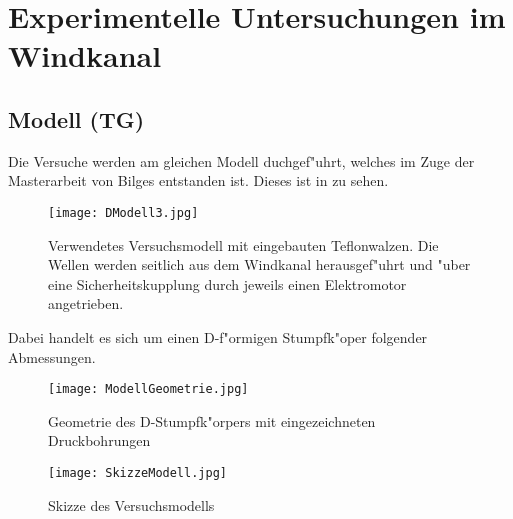 \chapter{Experimentelle Untersuchungen im Windkanal}\label{s:versuche}


\section{Modell (TG)}
Die Versuche werden am gleichen Modell duchgef"uhrt, welches im Zuge der Masterarbeit von Bilges \cite{Bilges.2018} entstanden ist. Dieses ist in  zu sehen.

\begin{figure}[h]
	\centering
	\texttt{[image: DModell3.jpg]}
	\caption{Verwendetes Versuchsmodell mit eingebauten Teflonwalzen. Die Wellen werden seitlich aus dem Windkanal herausgef"uhrt und "uber eine Sicherheitskupplung durch jeweils einen Elektromotor angetrieben.}
	\label{fig:DModell}
\end{figure}

 Dabei handelt es sich um einen D-f"ormigen  Stumpfk"oper folgender Abmessungen. 
\begin{figure}[h]
	\centering
	\texttt{[image: ModellGeometrie.jpg]}
	\caption{Geometrie des D-Stumpfk"orpers mit eingezeichneten Druckbohrungen \citep{Bilges.2018}}
	\label{fig:ModellGeometrie}
\end{figure}


\begin{figure}[h]
	\centering
	\texttt{[image: SkizzeModell.jpg]}
	\caption{Skizze des Versuchsmodells \citep{Bilges.2018}}
	\label{fig:SkizzeModell}
\end{figure}


\newpage





